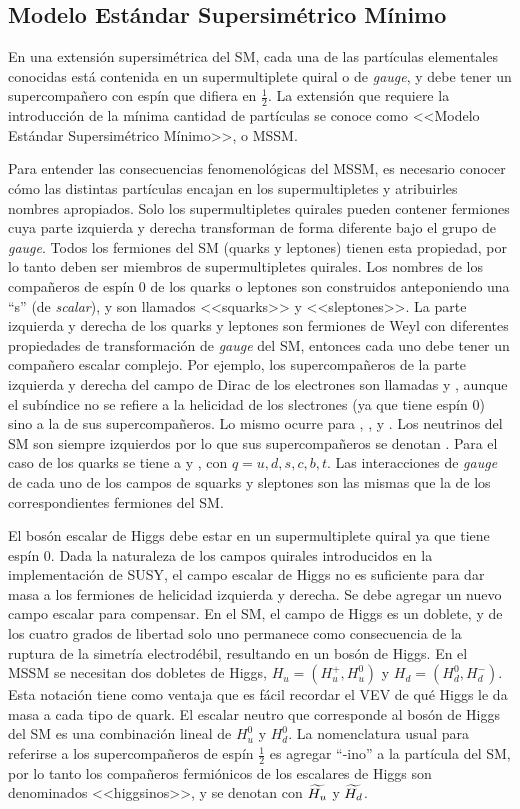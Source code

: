 \subsection{Modelo Estándar Supersimétrico Mínimo}

En una extensión supersimétrica del SM, cada una de las partículas elementales
conocidas está contenida en un supermultiplete quiral o de \emph{gauge}, y debe tener
un supercompa\~nero con espín que difiera en $\frac{1}{2}$. La extensión que
requiere la introducción de la mínima cantidad de partículas se conoce como
<<Modelo Estándar Supersimétrico Mínimo>>, o MSSM.

Para entender las consecuencias fenomenológicas del MSSM, es necesario conocer
cómo las distintas partículas encajan en los supermultipletes y atribuirles nombres
apropiados. Solo los supermultipletes quirales pueden contener fermiones cuya parte
izquierda y derecha transforman de forma diferente bajo el grupo de \emph{gauge}. Todos
los fermiones del SM (quarks y leptones) tienen esta propiedad, por lo tanto
deben ser miembros de supermultipletes quirales. Los nombres de los compañeros
de espín 0 de los quarks o leptones son construidos anteponiendo una ``s'' (de
\emph{scalar}), y son llamados <<squarks>> y <<sleptones>>.
La parte izquierda y derecha de los quarks y leptones son
fermiones de Weyl con diferentes propiedades de transformación de \emph{gauge} del SM,
entonces cada uno debe tener un compañero escalar complejo. Por ejemplo, los
supercompañeros de la parte izquierda y derecha del campo de Dirac de los
electrones son llamadas {\selL} y {\selR}, aunque el subíndice no se refiere a
la helicidad de los slectrones (ya que tiene espín 0) sino a la de sus supercompañeros.
Lo mismo ocurre para {\smuL}, {\smuR}, {\stauL} y {\stauR}. Los neutrinos del SM
son siempre izquierdos por lo que sus supercompañeros se denotan {\snu}. Para
el caso de los quarks se tiene a {\squarkL} y {\squarkR}, con $q = u, d, s, c, b, t$. Las
interacciones de \emph{gauge} de cada uno de los campos de squarks y sleptones son las
mismas que la de los correspondientes fermiones del SM.

El bosón escalar de Higgs debe estar en un supermultiplete quiral ya que tiene
espín 0. Dada la naturaleza de los campos quirales introducidos en la
implementación de SUSY, el campo escalar de Higgs no es suficiente para dar masa
a los fermiones de helicidad izquierda y derecha. Se debe agregar un nuevo campo
escalar para compensar. En el SM, el campo de Higgs es un doblete, y de los
cuatro grados de libertad solo uno permanece como consecuencia de la ruptura de
la simetría electrodébil, resultando en un bosón de Higgs. En el MSSM se
necesitan dos dobletes de Higgs, $H_u = (H_u^+, H_u^0)$ y $H_d = (H_d^0,
H_d^-)$. Esta notación tiene como ventaja que es fácil recordar el VEV de qué
Higgs le da masa a cada tipo de quark. El escalar neutro que corresponde al
bosón de Higgs del SM es una combinación lineal de $H_u^0$ y $H_d^0$. La
nomenclatura usual para referirse a los supercompa\~neros de espín $\frac{1}{2}$ es
agregar ``-ino'' a la partícula del SM, por lo tanto los compañeros fermiónicos
de los escalares de Higgs son denominados <<higgsinos>>, y se denotan con
$\widetilde{H_u}$ y $\widetilde{H_d}$.

